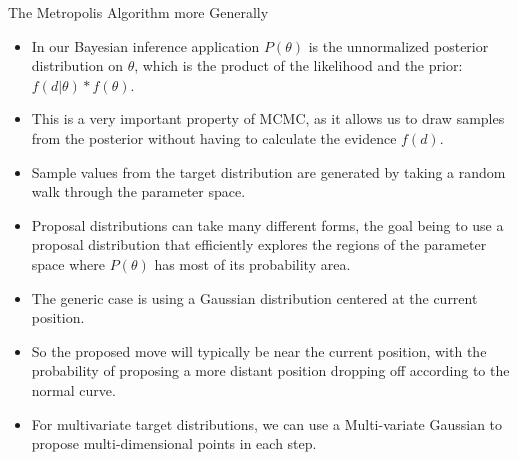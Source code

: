 \documentclass[handout]{beamer}
\begin{document}
\begin{frame}{The Metropolis Algorithm more Generally}
\scriptsize{

\begin{itemize}

\item In our Bayesian inference application $P(\theta)$ is the unnormalized posterior distribution on  $\theta$, which is the product of the likelihood and the prior: $f(d|\theta)*f(\theta)$.

\item This is a very important property of MCMC, as it allows us to draw samples from the posterior without having to calculate the evidence $f(d)$.

\item Sample values from the target distribution are generated by taking a random walk through the parameter space.

\item Proposal distributions can take many different forms,  the goal being to use a proposal distribution
that efficiently explores the regions of the parameter space where $P(\theta)$ has most of its probability area. 

\item The generic case is using a Gaussian distribution  centered at the current position. 

\item So the proposed move will typically be near the current position, with the probability of proposing a more distant position dropping off according to the normal curve.

\item For multivariate target distributions, we can use a Multi-variate Gaussian to propose multi-dimensional points in each step. 


\end{itemize}


} 
\end{frame}
\end{document}
